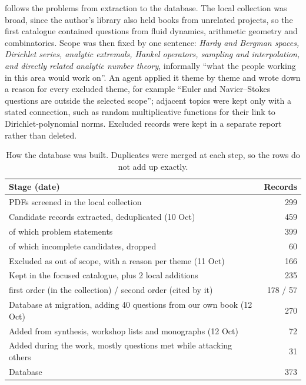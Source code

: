 \documentclass[11pt]{amsart}
\begin{document}
 follows the problems from extraction to the database. The
local collection was broad, since the author's library also held books from
unrelated projects, so the first catalogue contained questions from fluid
dynamics, arithmetic geometry and combinatorics. Scope was then fixed by one
sentence: \emph{Hardy and Bergman spaces, Dirichlet series, analytic extremals,
Hankel operators, sampling and interpolation, and directly related analytic
number theory}, informally ``what the people working in this area would work
on''. An agent applied it theme by theme and wrote down a reason for every
excluded theme, for example ``Euler and Navier--Stokes questions are outside
the selected scope''; adjacent topics were kept only with a stated connection,
such as random multiplicative functions for their link to Dirichlet-polynomial
norms. Excluded records were kept in a separate report rather than deleted.

\begin{table}[ht]
  \centering
  \begin{tabular}{lr}
    \toprule
    Stage (date)                                                          & Records  \\
    \midrule
    PDFs screened in the local collection                                 & 299      \\
    Candidate records extracted, deduplicated (10 Oct)                    & 459      \\
    \quad of which problem statements                                     & 399      \\
    \quad of which incomplete candidates, dropped                         & 60       \\
    Excluded as out of scope, with a reason per theme (11 Oct)            & 166      \\
    Kept in the focused catalogue, plus 2 local additions                 & 235      \\
    \quad first order (in the collection) / second order (cited by it)    & 178 / 57 \\
    Database at migration, adding 40 questions from our own book (12 Oct) & 270      \\
    Added from synthesis, workshop lists and monographs (12 Oct)          & 72       \\
    Added during the work, mostly questions met while attacking others    & 31       \\
    \midrule
    Database                                                              & 373      \\
    \bottomrule
  \end{tabular}
  \caption{How the database was built. Duplicates were merged at each step,
    so the rows do not add up exactly.}\label{tab:funnel}
\end{table}
\end{document}
